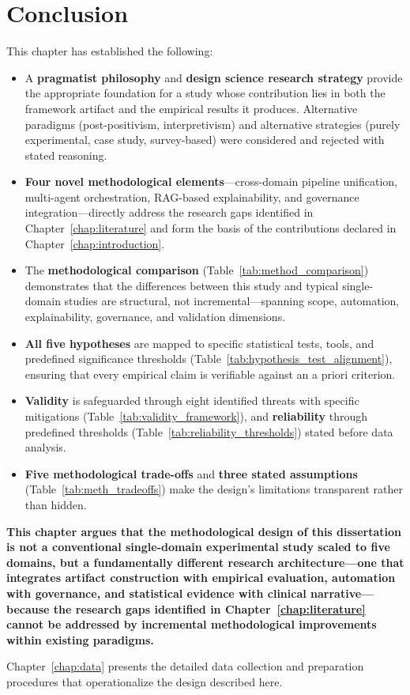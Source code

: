 \section{Conclusion}
\label{sec:meth_conclusion}

This chapter has established the following:

\begin{itemize}
    \item A \textbf{pragmatist philosophy} and \textbf{design science research strategy} provide the appropriate foundation for a study whose contribution lies in both the framework artifact and the empirical results it produces. Alternative paradigms (post-positivism, interpretivism) and alternative strategies (purely experimental, case study, survey-based) were considered and rejected with stated reasoning.
    \item \textbf{Four novel methodological elements}---cross-domain pipeline unification, multi-agent orchestration, RAG-based explainability, and governance integration---directly address the research gaps identified in Chapter~\ref{chap:literature} and form the basis of the contributions declared in Chapter~\ref{chap:introduction}.
    \item The \textbf{methodological comparison} (Table~\ref{tab:method_comparison}) demonstrates that the differences between this study and typical single-domain studies are structural, not incremental---spanning scope, automation, explainability, governance, and validation dimensions.
    \item \textbf{All five hypotheses} are mapped to specific statistical tests, tools, and predefined significance thresholds (Table~\ref{tab:hypothesis_test_alignment}), ensuring that every empirical claim is verifiable against an a priori criterion.
    \item \textbf{Validity} is safeguarded through eight identified threats with specific mitigations (Table~\ref{tab:validity_framework}), and \textbf{reliability} through predefined thresholds (Table~\ref{tab:reliability_thresholds}) stated before data analysis.
    \item \textbf{Five methodological trade-offs} and \textbf{three stated assumptions} (Table~\ref{tab:meth_tradeoffs}) make the design's limitations transparent rather than hidden.
\end{itemize}

\textbf{This chapter argues that the methodological design of this dissertation is not a conventional single-domain experimental study scaled to five domains, but a fundamentally different research architecture---one that integrates artifact construction with empirical evaluation, automation with governance, and statistical evidence with clinical narrative---because the research gaps identified in Chapter~\ref{chap:literature} cannot be addressed by incremental methodological improvements within existing paradigms.}

Chapter~\ref{chap:data} presents the detailed data collection and preparation procedures that operationalize the design described here.
